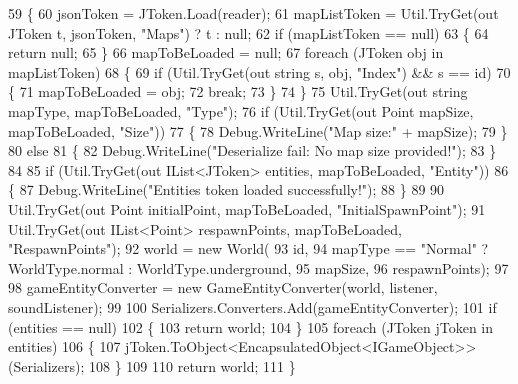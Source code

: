 \begin{DoxyCode}
59         \{
60             jsonToken = JToken.Load(reader);
61             mapListToken = Util.TryGet(out JToken t, jsonToken, \textcolor{stringliteral}{"Maps"}) ? t : null;
62             \textcolor{keywordflow}{if} (mapListToken == null)
63             \{
64                 \textcolor{keywordflow}{return} null;
65             \}
66             mapToBeLoaded = null;
67             \textcolor{keywordflow}{foreach} (JToken obj \textcolor{keywordflow}{in} mapListToken)
68             \{
69                 \textcolor{keywordflow}{if} (Util.TryGet(out \textcolor{keywordtype}{string} s, obj, \textcolor{stringliteral}{"Index"}) && s == id)
70                 \{
71                     mapToBeLoaded = obj;
72                     \textcolor{keywordflow}{break};
73                 \}
74             \}
75             Util.TryGet(out \textcolor{keywordtype}{string} mapType, mapToBeLoaded, \textcolor{stringliteral}{"Type"});
76             \textcolor{keywordflow}{if} (Util.TryGet(out Point mapSize, mapToBeLoaded, \textcolor{stringliteral}{"Size"}))
77             \{
78                 Debug.WriteLine(\textcolor{stringliteral}{"Map size:"} + mapSize);
79             \}
80             \textcolor{keywordflow}{else}
81             \{
82                 Debug.WriteLine(\textcolor{stringliteral}{"Deserialize fail: No map size provided!"});
83             \}
84 
85             \textcolor{keywordflow}{if} (Util.TryGet(out IList<JToken> entities, mapToBeLoaded, \textcolor{stringliteral}{"Entity"}))
86             \{
87                 Debug.WriteLine(\textcolor{stringliteral}{"Entities token loaded successfully!"});
88             \}
89 
90             Util.TryGet(out Point initialPoint, mapToBeLoaded, \textcolor{stringliteral}{"InitialSpawnPoint"});
91             Util.TryGet(out IList<Point> respawnPoints, mapToBeLoaded, \textcolor{stringliteral}{"RespawnPoints"});
92             world = \textcolor{keyword}{new} World(
93                 \textcolor{keywordtype}{id},
94                 mapType == \textcolor{stringliteral}{"Normal"} ? WorldType.normal : WorldType.underground,
95                 mapSize,
96                 respawnPoints);
97 
98             gameEntityConverter = \textcolor{keyword}{new} GameEntityConverter(world, listener, 
      soundListener);
99 
100             Serializers.Converters.Add(gameEntityConverter);
101             \textcolor{keywordflow}{if} (entities == null)
102             \{
103                 \textcolor{keywordflow}{return} world;
104             \}
105             \textcolor{keywordflow}{foreach} (JToken jToken \textcolor{keywordflow}{in} entities)
106             \{
107                 jToken.ToObject<EncapsulatedObject<IGameObject>>(Serializers);
108             \}
109 
110             \textcolor{keywordflow}{return} world;
111         \}
\end{DoxyCode}
\mbox{\label{classMelloMario_1_1LevelGen_1_1JsonConverters_1_1GameConverter_ad34993dc8fc13389152270cb1366efc8}} 
